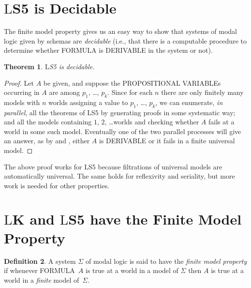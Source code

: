 \documentclass[10pt,a4paper]{article}
\makeatletter
\newcommand*{\olup}[1]{\MakeUppercase{#1}}
\theoremstyle{plain}
\newtheorem{thm}{Theorem}[section]
\theoremstyle{definition}
\newtheorem{defn}[thm]{Definition}
\theoremstyle{remark}
\newcommand*{\olfileid}[3]{}
\newcommand*{\olsection}[1]{\section*{#1}}
\newcommand{\olref}{\@ifnextchar[{\olref@i}{\olref@final}}
\def\olref@i[#1]{\@ifnextchar[{\olref@ii}{\olref@final}}
\def\olref@ii[#1]{\@ifnextchar[{\olref@iii}{\olref@final}}
\def\olref@iii[#1]{\olref@final}
\def\olref@final#1{\ref{#1}}
\providecommand{\Log}{\ensuremath{\mathrm{L}}}
\makeatother
\begin{document}



\olfileid{nml}{fil}{dec}

\olsection{\Log{S5} is Decidable}
The finite model property gives us an easy way to show that systems of
modal logic given by schemas are \emph{decidable} (i.e., that there is
a computable procedure to determine whether \olup{formula} is \olup{derivable} in
the system or not).

\begin{thm}
  \Log{S5} is decidable.
\end{thm}

\begin{proof}
  Let $A$ be given, and suppose the \olup{propositional variable}s
  occurring in $A$ are among $p_1$, \dots, $p_k$.  Since for each
  $n$ there are only finitely many models with $n$ worlds assigning a
  value to $p_1$, \dots, $p_k$, we can enumerate, \emph{in parallel}, all
  the theorems of \Log{S5} by generating proofs in some systematic
  way; and all the models containing $1$, $2$, \dots worlds and checking
  whether $A$ fails at a world in some such model. Eventually
  one of the two parallel processes will give an answer, as by
  \olref[com][fra]{thm:generaldet} and \olref[fmp]{cor:S5fmp}, either
  $A$ is \olup{derivable} or it fails in a finite universal model.
\end{proof}

The above proof works for \Log{S5} because filtrations of universal
models are automatically universal. The same holds for reflexivity and
seriality, but more work is needed for other properties.





\olfileid{nml}{fil}{fmp}

\olsection{\Log{K} and \Log{S5} have the Finite Model Property}

\begin{defn}
  A system $\Sigma$ of modal logic is said to have the \emph{finite
    model property} if whenever \olup{formula}~$A$ is true at a world
  in a model of $\Sigma$ then $A$ is true at a world in a
  \emph{finite} model of~$\Sigma$.
\end{defn}
\end{document}
